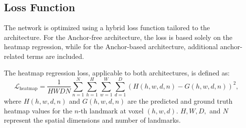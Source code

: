 



\subsection{Loss Function}

The network is optimized using a hybrid loss function tailored to the architecture. For the Anchor-free architecture, the loss is based solely on the heatmap regression, while for the Anchor-based architecture, additional anchor-related terms are included.

The heatmap regression loss, applicable to both architectures, is defined as:
\begin{equation}
\mathcal{L}_{\text{heatmap}} = \frac{1}{HWDN} \sum_{n=1}^N \sum_{h=1}^H \sum_{w=1}^W \sum_{d=1}^D (H(h, w, d, n) - G(h, w, d, n))^2,
\end{equation}
where \( H(h, w, d, n) \) and \( G(h, w, d, n) \) are the predicted and ground truth heatmap values for the \( n \)-th landmark at voxel \( (h, w, d) \). \( H, W, D, \) and \( N \) represent the spatial dimensions and number of landmarks.


